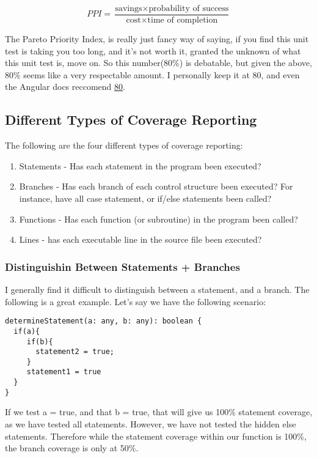 \[
PPI = \frac{\text{savings} \times \text{probability of success}}
           {\text{cost} \times \text{time of completion}}
\]

The Pareto Priority Index, is really just fancy way of saying, if you find this
unit test is taking you too long, and it's not worth it, granted the unknown
of what this unit test is, move on. So this number(80\%) is debatable, but given
the above, 80\% seems like a very respectable amount. I personally keep it at
80, and even the Angular docs reccomend \href{https://github.com/angular/angular-cli/wiki/stories-code-coverage}{80}.

\subsection{ Different Types of Coverage Reporting }
The following are the four different types of coverage reporting:
\begin{enumerate}
  \item Statements - Has each statement in the program been executed?
  \item Branches - Has each branch of each control structure been executed? For
  instance, have all case statement, or if/else statements been called?
  \item Functions - Has each function (or subroutine) in the program been called?
  \item Lines - has each executable line in the source file been executed?
\end{enumerate}

\subsubsection{Distinguishin Between Statements + Branches}
I generally find it difficult to distinguish between a statement, and a
branch. The following is a great example. Let's say we have the following
scenario:
\begin{lstlisting}
determineStatement(a: any, b: any): boolean {
  if(a){
     if(b){
       statement2 = true;
     }
     statement1 = true
  }
}
\end{lstlisting}

If we test a = true, and that b = true, that will give us 100\% statement
coverage, as we have tested all statements. However, we have not tested the
hidden else statements. Therefore while the statement coverage within our
function is 100\%, the branch coverage is only at 50\%.

